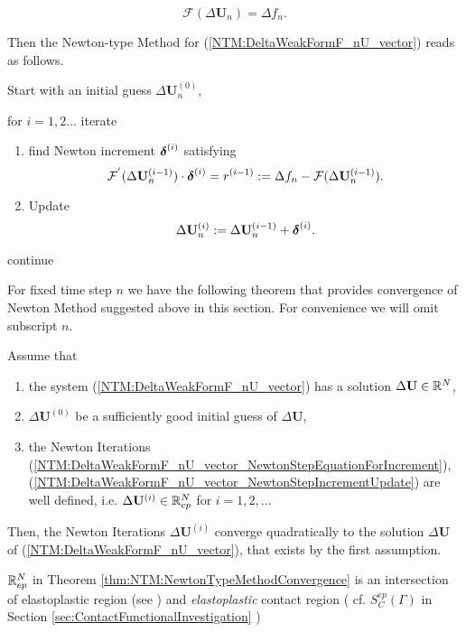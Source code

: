 \documentclass[12pt,a4paper]{scrbook}
\begin{document}
\begin{equation} \label{NTM:DeltaWeakFormF_nU_vector}
\mathcal{F}(\Delta \mathbf{U}_{n}) = \Delta f_{n}.
\end{equation}

Then  the Newton-type Method for (\ref{NTM:DeltaWeakFormF_nU_vector}) reads as follows.

Start with an initial guess $\Delta \mathbf{U}^{(0)}_{n}$, 

for $i=1,2\ldots$ iterate
\begin{enumerate}
 \item find Newton increment $\mbox{\boldmath$\delta$}^{(i)}$ satisfying
\begin{equation} \label{NTM:DeltaWeakFormF_nU_vector_NewtonStepEquationForIncrement}
\mathcal{F}^{'}(\Delta \mathbf{U}^{(i-1)}_{n})\cdot \mbox{\boldmath$\delta$}^{(i)} =r^{(i-1)}:= \Delta f_{n}-\mathcal{F}(\Delta \mathbf{U}^{(i-1)}_{n}).
\end{equation}

\item Update 
\begin{equation}\label{NTM:DeltaWeakFormF_nU_vector_NewtonStepIncrementUpdate}
\Delta \mathbf{U}^{(i)}_{n}:=\Delta \mathbf{U}^{(i-1)}_{n}+\mbox{\boldmath$\delta$}^{(i)}.
\end{equation}

\end{enumerate}
continue

For fixed time step $n$ we have the following theorem that provides convergence of Newton Method suggested above in this section. For convenience we will omit subscript $n$.
\begin{thm}\label{thm:NTM:NewtonTypeMethodConvergence}
 Assume that
\begin{enumerate}
 \item the system (\ref{NTM:DeltaWeakFormF_nU_vector}) has a solution $\Delta \mathbf{U} \in {\mathbb R}^{N}$,
 \item $\Delta \mathbf{U}^{(0)}$ be a sufficiently good initial guess of $\Delta \mathbf{U}$,
 \item the Newton Iterations (\ref{NTM:DeltaWeakFormF_nU_vector_NewtonStepEquationForIncrement}), (\ref{NTM:DeltaWeakFormF_nU_vector_NewtonStepIncrementUpdate}) are well defined, i.e. $\Delta \mathbf{U}^{(i)} \in {\mathbb R}_{ep}^{N}$ for $i=1,2,\ldots$
\end{enumerate}
Then, the Newton Iterations $\Delta \mathbf{U}^{(i)}$ converge quadratically to the solution $\Delta \mathbf{U}$ of  (\ref{NTM:DeltaWeakFormF_nU_vector}), that exists by the first assumption. 
\end{thm}
\begin{remark}
 ${\mathbb R}_{ep}^{N}$ in Theorem \ref{thm:NTM:NewtonTypeMethodConvergence} is an intersection of elastoplastic region (see \cite{Bl97}) and \textit{elastoplastic} contact region ( cf. $S_C^{ep}(\Gamma)$  in Section \ref{sec:ContactFunctionalInvestigation} )
\end{remark}
\end{document}
